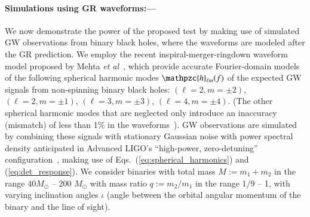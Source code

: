 \documentclass[prl,preprintnumbers,twocolumn,eqsecnum,floatfix,a4paper,nofootinbib,superscriptaddress]{revtex4}
\newcommand{\h}{\mathpzc{h}}
\newcommand{\etal}{\emph{et al}}
\begin{document}
\paragraph{Simulations using GR waveforms:---}
We now demonstrate the power of the proposed test by making use of simulated GW observations from binary black holes, where the waveforms are modeled after the GR prediction. We employ the recent inspiral-merger-ringdown waveform model proposed by Mehta \etal~\cite{Mehta:2017jpq}, which provide accurate Fourier-domain models of the following spherical harmonic modes $\h_{\ell m}(f)$ of the expected GW signals from non-spinning binary black holes: $(\ell = 2, m = \pm2)$, $(\ell = 2, m=\pm1)$, $(\ell = 3, m=\pm3)$, $(\ell = 4, m = \pm4)$. (The other spherical harmonic modes that are neglected only introduce an inaccuracy (mismatch) of less than 1\% in the waveforms~\cite{Mehta:2017jpq}). GW observations are simulated by combining these signals with stationary Gaussian noise with power spectral density anticipated in Advanced LIGO's ``high-power, zero-detuning'' configuration~\cite{aLIGOZeroDetHighPower}, making use of Eqs.~(\ref{eq:spherical_harmonics}) and (\ref{eq:det_response}). We consider binaries with total mass $M := m_1 + m_2$ in the range $40 M_\odot$ -- 200 $M_\odot$ with mass ratio $q := m_2/m_1$ in the range 1/9 -- 1, with varying inclination angles $\iota$ (angle between the orbital angular momentum of the binary and the line of sight). 
\end{document}
